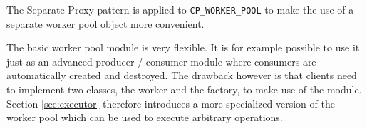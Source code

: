 % 
% 
% 
% 
%   
%   
% 
% 
% 


The Separate Proxy pattern is applied to \lstinline!CP_WORKER_POOL! to make the use of a separate worker pool object more convenient.

The basic worker pool module is very flexible.
It is for example possible to use it just as an advanced producer / consumer module where consumers are automatically created and destroyed.
The drawback however is that clients need to implement two classes, the worker and the factory, to make use of the module.
Section \ref{sec:executor} therefore introduces a more specialized version of the worker pool which can be used to execute arbitrary operations.



